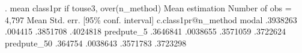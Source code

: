 . mean class1pr if touse3, over(n_method)
{\smallskip}
Mean estimation                                 Number of obs = 4,797
{\smallskip}
                    {\VBAR}       Mean   Std. err.     [95\% conf. interval]
c.class1pr@n_method {\VBAR}
             modal  {\VBAR}   .3938263    .004415      .3851708    .4024818
        predpute_5  {\VBAR}   .3646841   .0038655      .3571059    .3722624
       predpute_50  {\VBAR}    .364754   .0038643      .3571783    .3723298
